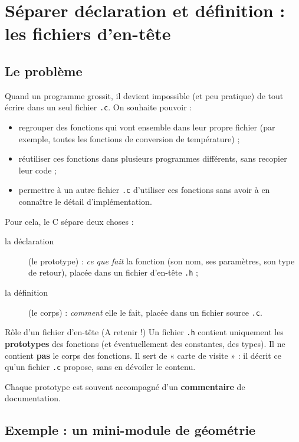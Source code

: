 \section{Séparer déclaration et définition : les fichiers d'en-tête}

\subsection{Le problème}

Quand un programme grossit, il devient impossible (et peu pratique) de tout écrire dans un seul fichier \texttt{.c}. On souhaite pouvoir :
\begin{itemize}
  \item regrouper des fonctions qui vont ensemble dans leur propre fichier (par exemple, toutes les fonctions de conversion de température) ;
  \item réutiliser ces fonctions dans plusieurs programmes différents, sans recopier leur code ;
  \item permettre à un autre fichier \texttt{.c} d'utiliser ces fonctions sans avoir à en connaître le détail d'implémentation.
\end{itemize}

Pour cela, le C sépare deux choses :
\begin{description}
  \item[la déclaration] (le prototype) : \emph{ce que fait} la fonction (son nom, ses paramètres, son type de retour), placée dans un fichier d'en-tête \texttt{.h} ;
  \item[la définition] (le corps) : \emph{comment} elle le fait, placée dans un fichier source \texttt{.c}.
\end{description}

\begin{UPSTIinfor}{Rôle d'un fichier d'en-tête (A retenir !)}
  Un fichier \texttt{.h} contient uniquement les \textbf{prototypes} des fonctions (et éventuellement des constantes, des types). Il ne contient \textbf{pas} le corps des fonctions. Il sert de « carte de visite » : il décrit ce qu'un fichier \texttt{.c} propose, sans en dévoiler le contenu.

  Chaque prototype est souvent accompagné d’un \textbf{commentaire} de documentation.
\end{UPSTIinfor}

\subsection{Exemple : un mini-module de géométrie}

